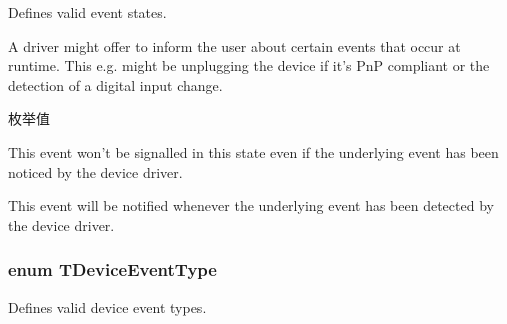 Defines valid event states. 

A driver might offer to inform the user about certain events that occur at runtime. This e.\+g. might be unplugging the device if it's Pn\+P compliant or the detection of a digital input change. \begin{Desc}
\item[枚举值]\par
\begin{description}
\item[{\em 
\hypertarget{group___common_interface_ggaaf184a07cd31343a6b831f41ee7038b4a428db97d58edd4f45f5b7e7bf1a87a9f}{dem\+Ignore}\label{group___common_interface_ggaaf184a07cd31343a6b831f41ee7038b4a428db97d58edd4f45f5b7e7bf1a87a9f}
}]This event won't be signalled in this state even if the underlying event has been noticed by the device driver. \item[{\em 
\hypertarget{group___common_interface_ggaaf184a07cd31343a6b831f41ee7038b4a96b9ffffa11d23585f046e907b928795}{dem\+Notify}\label{group___common_interface_ggaaf184a07cd31343a6b831f41ee7038b4a96b9ffffa11d23585f046e907b928795}
}]This event will be notified whenever the underlying event has been detected by the device driver. \end{description}
\end{Desc}
\hypertarget{group___common_interface_ga0947eb7d6a73b9baab283cbf65cd8d6b}{
\subsubsection[{T\+Device\+Event\+Type}]{\setlength{\rightskip}{0pt plus 5cm}enum {\bf T\+Device\+Event\+Type}}}\label{group___common_interface_ga0947eb7d6a73b9baab283cbf65cd8d6b}


Defines valid device event types. 

